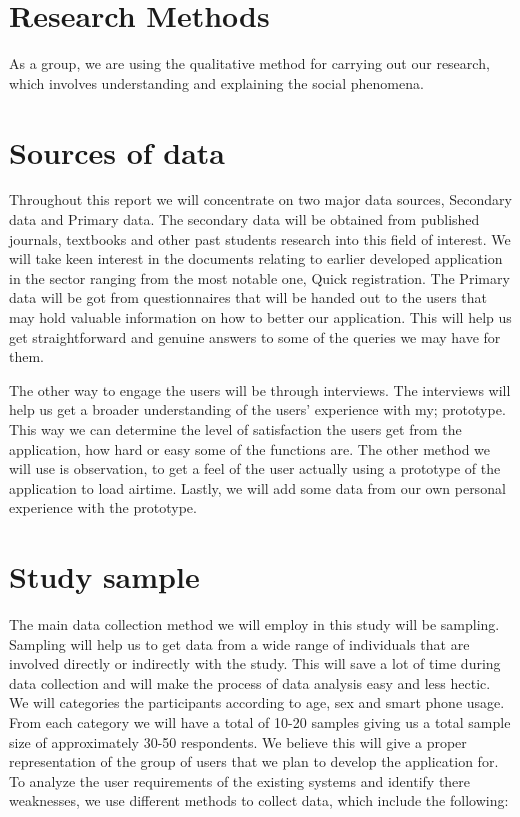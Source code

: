 \documentclass{article}
\begin{document}
\section{Research Methods}
{As a group, we are using the qualitative method for carrying out our research, which involves understanding and explaining the social phenomena.}
\section{Sources of data}  
{Throughout this report we will concentrate on two major data sources, Secondary data and Primary data. 
The secondary data will be obtained from published journals, textbooks and other past students research into this field of interest. We will take keen interest in the documents relating to earlier developed application in the sector ranging from the most notable one, Quick registration.  
The Primary data will be got from questionnaires that will be handed out to the users that may hold valuable information on how to better our application. This will help us get straightforward and genuine answers to some of the queries we may have for them.

 The other way to engage the users will be through interviews. The interviews will help us get a broader understanding of the users’ experience with my; prototype. This way we can determine the level of satisfaction the users get from the application, how hard or easy some of the functions are. 
The other method we will use is observation, to get a feel of the user actually using a prototype of the application to load airtime.  Lastly, we will add some data from our own personal experience with the prototype.}
\section{Study sample} 
{The main data collection method we will employ in this study will be sampling. Sampling will help us to get data from a wide range of individuals that are involved directly or indirectly with the study. This will save a lot of time during data collection and will make the process of data analysis easy and less hectic. We will categories the participants according to age, sex and smart phone usage. From each category we will have a total of 10-20 samples giving us a total sample size of approximately 30-50 respondents. We believe this will give a proper representation of the group of users that we plan to develop the application for. 
To analyze the user requirements of the existing systems and identify there weaknesses, we use different methods to collect data, which include the following:}
\end{document}
